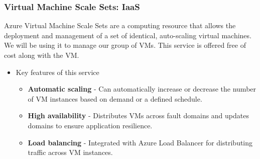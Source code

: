 \documentclass{llncs}
\begin{document}
\subsubsection{Virtual Machine Scale Sets: IaaS \cite{azurevirtualscale}} \leavevmode\newline
Azure Virtual Machine Scale Sets are a computing resource that allows the deployment and management of a set of identical, auto-scaling virtual machines.
We will be using it to manage our group of VMs. This service is offered free of cost along with the VM.
\begin{itemize}
    \item Key features of this service
          \begin{itemize}
              \item \textbf{Automatic scaling} -  Can automatically increase or decrease the number of VM instances based on demand or a defined schedule.
              \item \textbf{High availability} - Distributes VMs across fault domains and updates domains to ensure application resilience.
              \item \textbf{Load balancing} - Integrated with Azure Load Balancer for distributing traffic across VM instances.
          \end{itemize}
\end{itemize}
\end{document}
